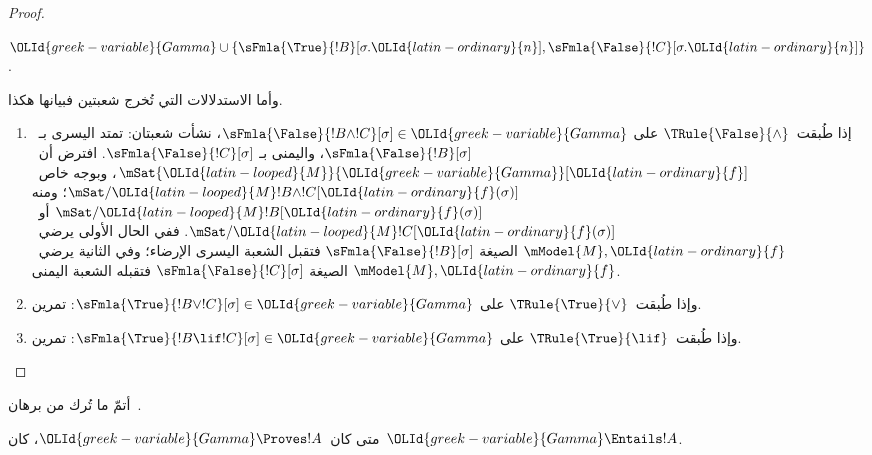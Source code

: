 \documentclass[../../../include/open-logic-section]{subfiles}
\begin{document}
\begin{proof}
\begin{enumerate}
  $\OLId{greek-variable}{Gamma} \cup \{\sFmla{\True}{!B}[\sigma.\OLId{latin-ordinary}{n}],
  \sFmla{\False}{!C}[\sigma.\OLId{latin-ordinary}{n}]\}$.
\end{enumerate}
وأما الاستدلالات التي تُخرج شعبتين فبيانها هكذا.
\begin{enumerate}
\item إذا طُبقت~$\TRule{\False}{\land}$ على
  $\sFmla{\False}{!B \land !C}[\sigma] \in \OLId{greek-variable}{Gamma}$، نشأت شعبتان:
  تمتد اليسرى بـ~$\sFmla{\False}{!B}[\sigma]$، واليمنى بـ
  $\sFmla{\False}{!C}[\sigma]$. افترض أن~$\mSat{\OLId{latin-looped}{M}}{\OLId{greek-variable}{Gamma}}[\OLId{latin-ordinary}{f}]$،
  وبوجه خاص~$\mSat/{\OLId{latin-looped}{M}}{!B \land !C}[\OLId{latin-ordinary}{f}(\sigma)]$؛ ومنه
  $\mSat/{\OLId{latin-looped}{M}}{!B}[\OLId{latin-ordinary}{f}(\sigma)]$ أو~$\mSat/{\OLId{latin-looped}{M}}{!C}[\OLId{latin-ordinary}{f}(\sigma)]$.
  ففي الحال الأولى يرضي~$\mModel{M}, \OLId{latin-ordinary}{f}$ الصيغة
  $\sFmla{\False}{!B}[\sigma]$ فتقبل الشعبة اليسرى الإرضاء؛ وفي
  الثانية يرضي~$\mModel{M}, \OLId{latin-ordinary}{f}$ الصيغة
  $\sFmla{\False}{!C}[\sigma]$ فتقبله الشعبة اليمنى.
\item وإذا طُبقت~$\TRule{\True}{\lor}$ على
    $\sFmla{\True}{!B \lor !C}[\sigma] \in \OLId{greek-variable}{Gamma}$: تمرين.
\item وإذا طُبقت~$\TRule{\True}{\lif}$ على
    $\sFmla{\True}{!B \lif !C}[\sigma] \in \OLId{greek-variable}{Gamma}$: تمرين.
\end{enumerate}
\end{proof}

\begin{prob}
أتمّ ما تُرك من برهان~.
\end{prob}

\begin{cor}
متى كان~$\OLId{greek-variable}{Gamma} \Proves !A$، كان~$\OLId{greek-variable}{Gamma} \Entails !A$.
\end{cor}
\end{document}
